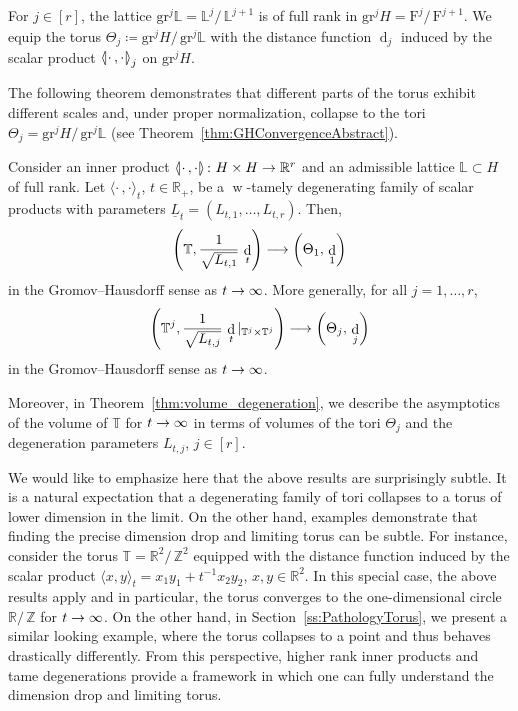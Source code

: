 \documentclass[AHL,Unicode,longabstracts]{cedram}
\newcommand{\innone}[2]{{\langle#2\rangle_{#1}}}
\newcommand{\llangle}{\mathopen{\langle\mkern -3.1mu\lvert}}
\newcommand{\rrangle}{\mathclose{\rvert\mkern -3.1mu\rangle}}
\newcommand{\highinn}[2]{{\llangle#2\rrangle_{#1}}}
\newcommand{\rest}[1]{\vert_{#1}}
\newcommand{\rquot}[2]{#1/\,#2}
\DeclareMathOperator{\weak}{w}
\DeclareMathOperator{\dist}{d}
\newcommand{\filter}{\mathrm{F}}
\newcommand{\R}{\mathbb{R}}
\newcommand{\Z}{\mathbb{Z}}
\newcommand{\T}{\mathbb{T}}
\renewcommand{\L}{\mathbb{L}}
\newcommand{\grm}[2]{\mathrm{gr}_{#1}^{#2}}
\renewcommand*{\to}{\mathchoice{\longrightarrow}{\rightarrow}{\rightarrow}{\rightarrow}}
\begin{document}
For $j \in [r]$, the lattice $\grm{}{j}\L = \rquot{\L^j}{\L^{j+1}}$ is of full rank in $\grm{}{j} H =\rquot{ \filter^j }{\filter^{j+1}}$. We equip the torus $\Theta_j \coloneqq \rquot{\grm{}{j}H}{\grm{}{j}\L}$ with the distance function $\dist_j$ induced by the scalar product $\highinn{j}{\cdot \,,\cdot}$ on $\grm{}{j} H$.


The following theorem demonstrates that different parts of the torus exhibit different scales and, under proper normalization, collapse to the tori $\Theta_j = \rquot{\grm{}{j}H}{\grm{}{j}\L}$ (see Theorem~\ref{thm:GHConvergenceAbstract}).

\begin{theo} \label{thm:GHConvergenceIntro}
Consider an inner product $\highinn{}{\cdot \,, \cdot} \colon H \times H \to \R^r$ and an admissible lattice $\L \subset H$ of full rank. Let $\innone{t}{\cdot\,, \cdot}$, $t \in \R_+$, be a $\weak$-tamely degenerating family of scalar products with parameters $\underline L_t =(L_{t,1}, \dots, L_{t,r})$. Then,
\[
\left(\T, \frac{1}{\sqrt{L_{t,1}}} \, \dist_t \right) \to \left(\Theta_1, \, \dist_{1} \right)
\]
in the Gromov--Hausdorff sense as $t \to \infty$. More generally, for all $j=1, \dots, r$,
\[
\left(\T^j,\frac{1}{\sqrt{L_{t,j}}} \,\dist_t \rest{\T^j\times \T^j} \right) \to \left(\Theta_j, \, \dist_{j} \right)
\]
in the Gromov--Hausdorff sense as $t \to \infty$.
\end{theo}

Moreover, in Theorem~\ref{thm:volume_degeneration}, we describe the asymptotics of the volume of $\T$ for $t \to \infty$ in terms of volumes of the tori $\Theta_j$ and the degeneration parameters $L_{t,j}$, $j \in [r]$.




We would like to emphasize here that the above results are surprisingly subtle. It is a natural expectation that a degenerating family of tori collapses to a torus of lower dimension in the limit. On the other hand, examples demonstrate that finding the precise dimension drop and limiting torus can be subtle. For instance, consider the torus $\T= \rquot{\R^2}{\Z^2}$ equipped with the distance function induced by the scalar product $\innone{t}{x,y} = x_1 y_1 + t^{-1} x_2 y_2$, $x,y \in \R^2$. In this special case, the above results apply and in particular, the torus converges to the one-dimensional circle $\rquot{\R}{\Z}$ for $t \to\infty$. On the other hand, in Section~\ref{ss:PathologyTorus}, we present a similar looking example, where the torus collapses to a point and thus behaves drastically differently. From this perspective, higher rank inner products and tame degenerations provide a framework in which one can fully understand the dimension drop and limiting torus.
\end{document}
